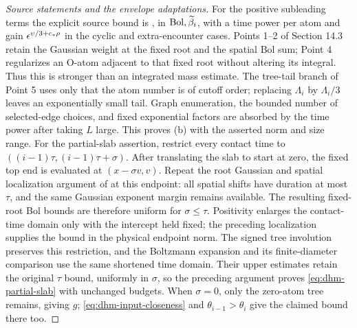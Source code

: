 \begin{proof}[Source statements and the envelope adaptations]
For the positive subleading terms the explicit source bound is
\cite[Equation (14.28)]{DHM2025}, in
\(\mathrm{Bol},\widetilde\beta_i\), with a time power per atom and gain
\(\epsilon^{\upsilon/3+c_*\rho}\) in the cyclic and extra-encounter cases.
Points 1--2 of Section 14.3 retain the Gaussian weight at the fixed
root and the spatial Bol sum; Point 4 regularizes an O-atom adjacent
to that fixed root without altering its integral. Thus this is stronger
than an integrated mass estimate. The tree-tail branch of Point 5 uses
only that the atom number is of cutoff order; replacing
\(\Lambda_i\) by \(\Lambda_i/3\) leaves an exponentially small tail.
Graph enumeration, the bounded number of selected-edge choices, and
fixed exponential factors are absorbed by the time power after taking
\(L\) large. This proves (b) with the asserted norm and size range.
For the partial-slab assertion, restrict every contact time to
\(((i-1)\tau,(i-1)\tau+\sigma)\). After translating the slab to start
at zero, the fixed top end is evaluated at \((x-\sigma v,v)\).
Repeat the root Gaussian and spatial localization argument of
\cite[Section 14.3, Points 1--2]{DHM2025} at this endpoint: all spatial
shifts have duration at most \(\tau\), and the same Gaussian exponent
margin remains available. The resulting fixed-root Bol bounds are
therefore uniform for \(\sigma\le\tau\). Positivity enlarges the
contact-time domain only with the intercept held fixed; the preceding
localization supplies the bound in the physical endpoint norm.
The signed tree involution
preserves this restriction, and the Boltzmann expansion and its
finite-diameter comparison use the same shortened time domain.
Their upper estimates retain the original \(\tau\) bound, uniformly
in \(\sigma\), so the preceding argument proves
\eqref{eq:dhm-partial-slab} with unchanged budgets. When
\(\sigma=0\), only the zero-atom tree remains, giving \(g\);
\eqref{eq:dhm-input-closeness} and
\(\theta_{i-1}>\theta_i\) give the claimed bound there too.
\end{proof}

